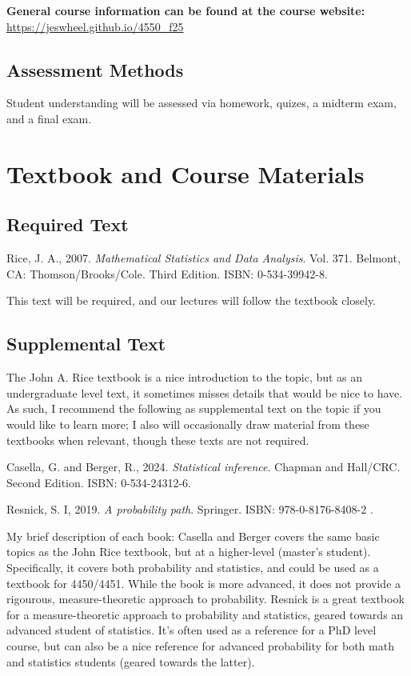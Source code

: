 \documentclass[11pt]{article}\usepackage[]{graphicx}\usepackage[]{xcolor}
\begin{document}
\textbf{General course information can be found at the course website:} \url{https://jeswheel.github.io/4550\_f25}

\subsection{Assessment Methods}

Student understanding will be assessed via homework, quizes, a midterm exam, and a final exam.

\section{Textbook and Course Materials}

\subsection{Required Text}
\begin{hangparas}{0.25in}{1}
Rice, J. A., 2007. \emph{Mathematical Statistics and Data Analysis}. Vol. 371. Belmont, CA: Thomson/Brooks/Cole. Third Edition. ISBN: 0-534-39942-8.
\end{hangparas}

This text will be required, and our lectures will follow the textbook closely.

\subsection{Supplemental Text}

The John A. Rice textbook is a nice introduction to the topic, but as an undergraduate level text, it sometimes misses details that would be nice to have. 
As such, I recommend the following as supplemental text on the topic if you would like to learn more; I also will occasionally draw material from these textbooks when relevant, though these texts are not required.

\begin{hangparas}{0.25in}{1}
Casella, G. and Berger, R., 2024. \emph{Statistical inference}. Chapman and Hall/CRC. Second Edition. ISBN: 0-534-24312-6.
\end{hangparas}

\begin{hangparas}{0.25in}{1}
Resnick, S. I, 2019. \emph{A probability path}. Springer. ISBN: 978-0-8176-8408-2
.
\end{hangparas}

My brief description of each book: Casella and Berger covers the same basic topics as the John Rice textbook, but at a higher-level (master's student). Specifically, it covers both probability and statistics, and could be used as a textbook for 4450/4451. While the book is more advanced, it does not provide a rigourous, measure-theoretic approach to probability.
Resnick is a great textbook for a measure-theoretic approach to probability and statistics, geared towards an advanced student of statistics. It's often used as a reference for a PhD level course, but can also be a nice reference for advanced probability for both math and statistics students (geared towards the latter).
\end{document}
